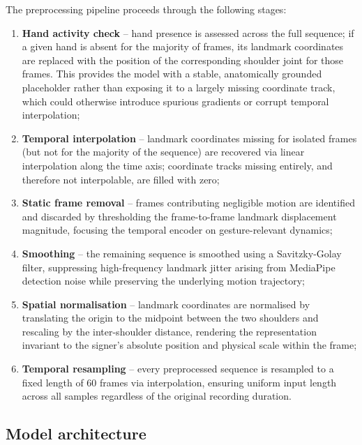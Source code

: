 The preprocessing pipeline proceeds through the following stages:

\begin{enumerate}
  \item \textbf{Hand activity check} -- hand presence is assessed across the
        full sequence; if a given hand is absent for the majority of frames,
        its landmark coordinates are replaced with the position of the
        corresponding shoulder joint for those frames. This provides the model
        with a stable, anatomically grounded placeholder rather than exposing
        it to a largely missing coordinate track, which could otherwise
        introduce spurious gradients or corrupt temporal interpolation;
  \item \textbf{Temporal interpolation} -- landmark coordinates missing for
        isolated frames (but not for the majority of the sequence) are
        recovered via linear interpolation along the time axis; coordinate
        tracks missing entirely, and therefore not interpolable, are filled
        with zero;
  \item \textbf{Static frame removal} -- frames contributing negligible motion
        are identified and discarded by thresholding the frame-to-frame
        landmark displacement magnitude, focusing the temporal encoder on
        gesture-relevant dynamics;
  \item \textbf{Smoothing} -- the remaining sequence is smoothed using a
        Savitzky-Golay filter, suppressing high-frequency landmark jitter
        arising from MediaPipe detection noise while preserving the underlying
        motion trajectory;
  \item \textbf{Spatial normalisation} -- landmark coordinates are normalised
        by translating the origin to the midpoint between the two shoulders and
        rescaling by the inter-shoulder distance, rendering the representation
        invariant to the signer's absolute position and physical scale within
        the frame;
  \item \textbf{Temporal resampling} -- every preprocessed sequence is resampled
        to a fixed length of 60 frames via interpolation, ensuring uniform
        input length across all samples regardless of the original recording
        duration.
\end{enumerate}

\subsection{Model architecture}
\label{sec:gloss-recognition-model}

